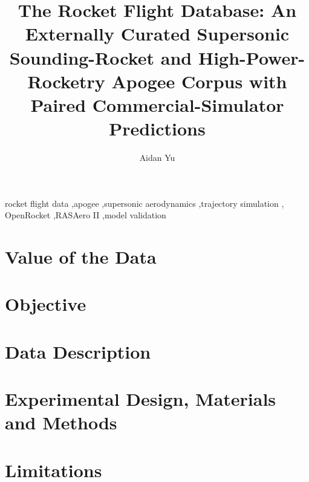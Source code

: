 \documentclass[preprint,12pt]{elsarticle}
\begin{document}
\begin{frontmatter}

\title{The Rocket Flight Database: An Externally Curated Supersonic Sounding-Rocket and High-Power-Rocketry Apogee Corpus with Paired Commercial-Simulator Predictions}

\author[duke]{Aidan Yu}
\address[duke]{Department of Mechanical Engineering \& Materials Science, Duke University, Durham, NC~27708, USA}

\begin{abstract}

\end{abstract}

\begin{keyword}
rocket flight data \sep apogee \sep supersonic aerodynamics \sep trajectory simulation \sep
OpenRocket \sep RASAero II \sep model validation
\end{keyword}

\end{frontmatter}



\section*{Value of the Data}


\section{Objective}


\section{Data Description}


\section{Experimental Design, Materials and Methods}


\section{Limitations}






\end{document}
